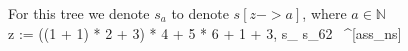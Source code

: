 \documentclass[varwidth=100cm]{standalone}
\begin{document}
For this tree we denote $s_{a}$ to denote $s[z->a]$, where $a\in \mathbb{N}$\\  

	\langle z := ((1 + 1) * 2 + 3) * 4 + 5 * 6 + 1 + 3, s_{\bot} \rangle \rightarrow s_{62} \ ^{[ass_{ns}]}
\end{document}
